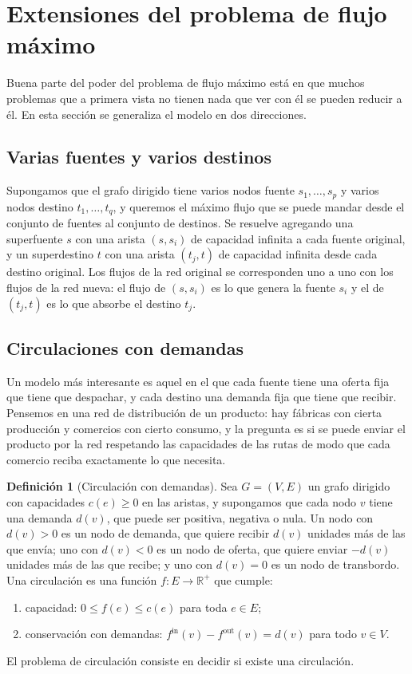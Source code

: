 \documentclass[12pt, spanish, oneside, openany]{book}
\theoremstyle{uprightplain}
\theoremstyle{definition}
\newtheorem{definicion}[teorema]{Definición}
\theoremstyle{remark}
\theoremstyle{definition}
\begin{document}
\section{Extensiones del problema de flujo máximo}
\label{sec:flujo-extensiones}

Buena parte del poder del problema de flujo máximo está en que muchos problemas que a primera vista no tienen nada que ver con él se pueden reducir a él. En esta sección se generaliza el modelo en dos direcciones.

\subsection{Varias fuentes y varios destinos}

Supongamos que el grafo dirigido tiene varios nodos fuente $s_1,\dots,s_p$ y varios nodos destino $t_1,\dots,t_q$, y queremos el máximo flujo que se puede mandar desde el conjunto de fuentes al conjunto de destinos. Se resuelve agregando una superfuente $s$ con una arista $(s,s_i)$ de capacidad infinita a cada fuente original, y un superdestino $t$ con una arista $(t_j,t)$ de capacidad infinita desde cada destino original. Los flujos de la red original se corresponden uno a uno con los flujos de la red nueva: el flujo de $(s,s_i)$ es lo que genera la fuente $s_i$ y el de $(t_j,t)$ es lo que absorbe el destino $t_j$.

\subsection{Circulaciones con demandas}

Un modelo más interesante es aquel en el que cada fuente tiene una oferta fija que tiene que despachar, y cada destino una demanda fija que tiene que recibir. Pensemos en una red de distribución de un producto: hay fábricas con cierta producción y comercios con cierto consumo, y la pregunta es si se puede enviar el producto por la red respetando las capacidades de las rutas de modo que cada comercio reciba exactamente lo que necesita.

\begin{definicion}[Circulación con demandas]
\label{def:flujo-circulacion}
Sea $G=(V,E)$ un grafo dirigido con capacidades $c(e)\ge 0$ en las aristas, y supongamos que cada nodo $v$ tiene una demanda $d(v)$, que puede ser positiva, negativa o nula. Un nodo con $d(v)>0$ es un nodo de demanda, que quiere recibir $d(v)$ unidades más de las que envía; uno con $d(v)<0$ es un nodo de oferta, que quiere enviar $-d(v)$ unidades más de las que recibe; y uno con $d(v)=0$ es un nodo de transbordo. Una circulación es una función $f:E\to\mathbb{R}^{+}$ que cumple:
\begin{enumerate}[label=(\roman*)]
    \item capacidad: $0\le f(e)\le c(e)$ para toda $e\in E$;
    \item conservación con demandas: $f^{\mathrm{in}}(v)-f^{\mathrm{out}}(v)=d(v)$ para todo $v\in V$.
\end{enumerate}
El problema de circulación consiste en decidir si existe una circulación.
\end{definicion}
\end{document}

